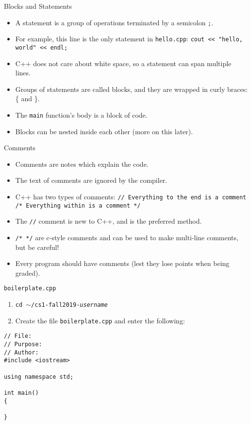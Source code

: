 \documentclass{beamer}
\begin{document}
\begin{frame}{Blocks and Statements}
    \begin{itemize}[<+->]
        \item A statement is a group of operations terminated by
            a semicolon \texttt{;}.
        \item For example, this line is the only statement in
            \texttt{hello.cpp}:
            \newline
            \texttt{cout << "hello, world" << endl;}
        \item C++ does not care about white space, so a statement can
            span multiple lines.
        \item Groups of statements are called blocks, and they are
            wrapped in curly braces: \{ and \}.
        \item The \texttt{main} function's body is a block of code.
        \item Blocks can be nested inside each other (more on this
            later).
    \end{itemize}
\end{frame}

\begin{frame}[fragile]{Comments}
    \begin{itemize}[<+->]
        \item Comments are notes which explain the code.
        \item The text of comments are ignored by the compiler.
        \item C++ has two types of comments:
            \newline\texttt{// Everything to the end is a comment}
            \newline\texttt{/* Everything within is a comment */}
        \item The \texttt{//} comment is new to C++, and is the
            preferred method.
        \item \texttt{/* */} are c-style comments and can be used to make multi-line
            comments, but be careful!
        \item Every program should have comments (lest they lose
            points when being graded).
    \end{itemize}
\end{frame}

\begin{frame}[fragile]{\texttt{boilerplate.cpp}}
    \begin{enumerate}
        \item \texttt{cd $\sim$/cs1-fall2019-{\em username}}
        \item Create the file \texttt{boilerplate.cpp} and enter the following:
    \end{enumerate}
    \begin{verbatim}
// File:
// Purpose:
// Author:
#include <iostream>

using namespace std;

int main()
{

}
    \end{verbatim}
\end{frame}
\end{document}
